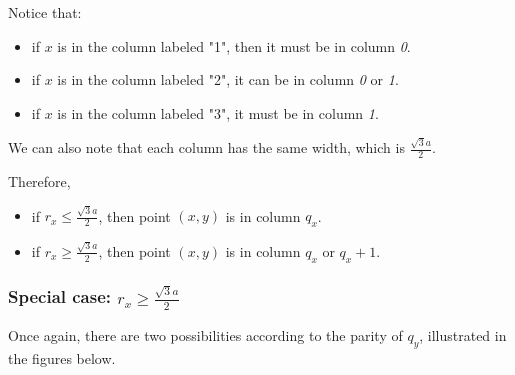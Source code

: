 \documentclass{article}
\begin{document}
\begin{minipage}{0.45\linewidth}
\raggedleft
{}
\end{minipage}
\begin{minipage}{0.55\linewidth}
\raggedright
Notice that:
\begin{itemize}
\item if $x$ is in the column labeled "1", then it must be in column \textit{0}.
\item if $x$ is in the column labeled "2", it can be in column \textit{0} or \textit{1}.
\item if $x$ is in the column labeled "3", it must be in column \textit{1}.
\end{itemize}
\end{minipage}
We can also note that each column has the same width, which is $\frac{\sqrt{3}a}{2}$.

Therefore,
\begin{itemize}
\item if $r_x \leq \frac{\sqrt{3}a}{2}$, then point $(x,y)$ is in column $q_x$.
\item if $r_x \geq \frac{\sqrt{3}a}{2}$, then point $(x,y)$ is in column $q_x$ or $q_x +1$.
\end{itemize}

\subsubsection{Special case: $r_x \geq \frac{\sqrt{3}a}{2}$}
Once again, there are two possibilities according to the parity of $q_y$, illustrated in the figures below.
\end{document}

